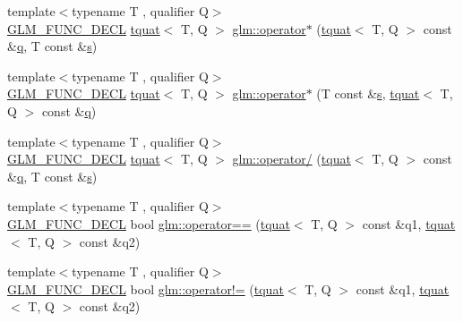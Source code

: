 \begin{DoxyCompactItemize}
\item 
{\footnotesize template$<$typename T , qualifier Q$>$ }\\\mbox{\hyperlink{setup_8hpp_ab2d052de21a70539923e9bcbf6e83a51}{G\+L\+M\+\_\+\+F\+U\+N\+C\+\_\+\+D\+E\+CL}} \mbox{\hyperlink{structglm_1_1tquat}{tquat}}$<$ T, Q $>$ \mbox{\hyperlink{group__gtc__quaternion_ga603ee29c61884b9438d5eae0c548b891}{glm\+::operator$\ast$}} (\mbox{\hyperlink{structglm_1_1tquat}{tquat}}$<$ T, Q $>$ const \&\mbox{\hyperlink{_s_d_l__opengl_8h_a8fc1e7b9baaae687804c7eed46ca09c6}{q}}, T const \&\mbox{\hyperlink{_s_d_l__opengl_8h_a4af680a6c683f88ed67b76f207f2e6e4}{s}})
\item 
{\footnotesize template$<$typename T , qualifier Q$>$ }\\\mbox{\hyperlink{setup_8hpp_ab2d052de21a70539923e9bcbf6e83a51}{G\+L\+M\+\_\+\+F\+U\+N\+C\+\_\+\+D\+E\+CL}} \mbox{\hyperlink{structglm_1_1tquat}{tquat}}$<$ T, Q $>$ \mbox{\hyperlink{group__gtc__quaternion_ga4203f1da1798e6f6dd2549c6daec4e5a}{glm\+::operator$\ast$}} (T const \&\mbox{\hyperlink{_s_d_l__opengl_8h_a4af680a6c683f88ed67b76f207f2e6e4}{s}}, \mbox{\hyperlink{structglm_1_1tquat}{tquat}}$<$ T, Q $>$ const \&\mbox{\hyperlink{_s_d_l__opengl_8h_a8fc1e7b9baaae687804c7eed46ca09c6}{q}})
\item 
{\footnotesize template$<$typename T , qualifier Q$>$ }\\\mbox{\hyperlink{setup_8hpp_ab2d052de21a70539923e9bcbf6e83a51}{G\+L\+M\+\_\+\+F\+U\+N\+C\+\_\+\+D\+E\+CL}} \mbox{\hyperlink{structglm_1_1tquat}{tquat}}$<$ T, Q $>$ \mbox{\hyperlink{group__gtc__quaternion_ga077354a34d5111b6c904db7bf331a31f}{glm\+::operator/}} (\mbox{\hyperlink{structglm_1_1tquat}{tquat}}$<$ T, Q $>$ const \&\mbox{\hyperlink{_s_d_l__opengl_8h_a8fc1e7b9baaae687804c7eed46ca09c6}{q}}, T const \&\mbox{\hyperlink{_s_d_l__opengl_8h_a4af680a6c683f88ed67b76f207f2e6e4}{s}})
\item 
{\footnotesize template$<$typename T , qualifier Q$>$ }\\\mbox{\hyperlink{setup_8hpp_ab2d052de21a70539923e9bcbf6e83a51}{G\+L\+M\+\_\+\+F\+U\+N\+C\+\_\+\+D\+E\+CL}} bool \mbox{\hyperlink{group__gtc__quaternion_ga5892999628e2bcd46279c8df9be904b7}{glm\+::operator==}} (\mbox{\hyperlink{structglm_1_1tquat}{tquat}}$<$ T, Q $>$ const \&q1, \mbox{\hyperlink{structglm_1_1tquat}{tquat}}$<$ T, Q $>$ const \&q2)
\item 
{\footnotesize template$<$typename T , qualifier Q$>$ }\\\mbox{\hyperlink{setup_8hpp_ab2d052de21a70539923e9bcbf6e83a51}{G\+L\+M\+\_\+\+F\+U\+N\+C\+\_\+\+D\+E\+CL}} bool \mbox{\hyperlink{group__gtc__quaternion_ga82de7204717a61a57d1bd321902bb9c6}{glm\+::operator!=}} (\mbox{\hyperlink{structglm_1_1tquat}{tquat}}$<$ T, Q $>$ const \&q1, \mbox{\hyperlink{structglm_1_1tquat}{tquat}}$<$ T, Q $>$ const \&q2)

\end{DoxyCompactItemize}
